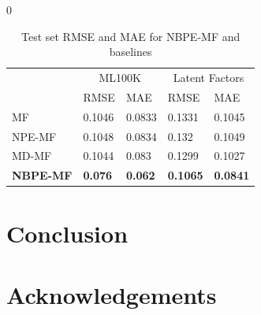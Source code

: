 \documentclass{article}
\begin{document}
\begin{table}0
  \caption{Test set RMSE and MAE for NBPE-MF and baselines}
  \label{sample-table}
  \centering
  \begin{tabular}{lllll}
    \toprule               
                     & \multicolumn{2}{c}{ML100K} & \multicolumn{2}{c}{Latent Factors}                                     \\
    \cmidrule(r){2-5}
                     & RMSE                       & MAE                                & RMSE            & MAE             \\
    \midrule
    MF               & 0.1046                     & 0.0833                             & 0.1331          & 0.1045          \\ 
    NPE-MF           & 0.1048                     & 0.0834                             & 0.132           & 0.1049          \\ 
    MD-MF            & 0.1044                     & 0.083                              & 0.1299          & 0.1027          \\
    \textbf{NBPE-MF} & \textbf{0.076}             & \textbf{0.062}                     & \textbf{0.1065} & \textbf{0.0841} \\ 
    \bottomrule
  \end{tabular}
\end{table}

\section{Conclusion}

\section*{Acknowledgements}



\end{document}
